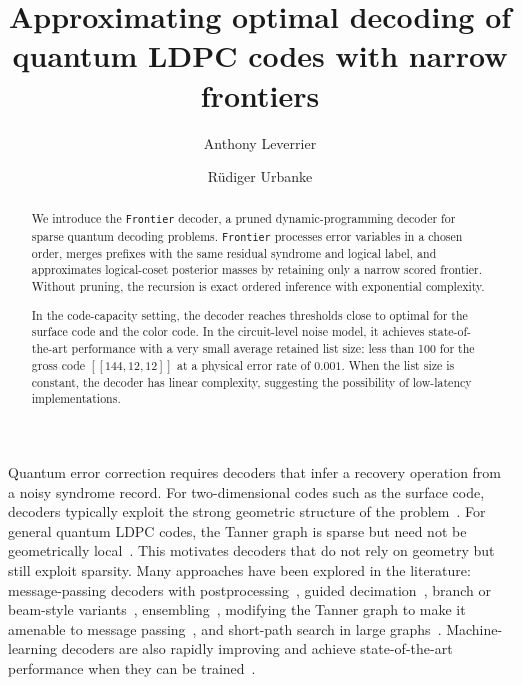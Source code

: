 \documentclass[a4paper,twocolumn,11pt,unpublished]{quantumarticle}
\newcommand{\frontier}{\texttt{Frontier}}
\begin{document}
\title{Approximating optimal decoding of quantum LDPC codes with narrow frontiers}

\author[AL]{Anthony Leverrier}
\author[RU]{R{\"u}diger Urbanke}

\begin{abstract}
We introduce the \frontier{} decoder, a pruned dynamic-programming decoder for sparse quantum decoding problems.  \frontier{} processes error variables in a chosen order, merges prefixes with the same residual syndrome and logical label, and approximates logical-coset posterior masses by retaining only a narrow scored frontier.  Without pruning, the recursion is exact ordered inference with exponential complexity. 

In the code-capacity setting, the decoder reaches thresholds close to optimal for the surface code and the color code. In the circuit-level noise model, it achieves state-of-the-art performance with a very small average retained list size: less than 100 for the gross code $[[144,12,12]]$ at a physical error rate of $0.001$. When the list size is constant, the decoder has linear complexity, suggesting the possibility of low-latency implementations.
\end{abstract}



\maketitle

Quantum error correction requires decoders that infer a recovery operation from a noisy syndrome record.  
For two-dimensional codes such as the surface code, decoders typically exploit the strong geometric structure of the problem~\cite{Dennis2002,Edmonds1965,Fowler2012Surface,Delfosse2021UnionFind,Bravyi2014TensorNetwork,Higgott2022PyMatching,HiggottGidney2025SparseBlossom}.  For general quantum LDPC codes, the Tanner graph is sparse but need not be geometrically local~\cite{MacKay2004SparseGraphQuantum,TillichZemor2014HGP,Breuckmann2021QLDPC,PanteleevKalachev2022GoodQLDPC,LeverrierZemor2022QuantumTanner,Bravyi2024BB}.  This motivates decoders that do not rely on geometry but still exploit sparsity. Many approaches have been explored in the literature: message-passing decoders with postprocessing~\cite{Roffe2020BP_OSD,Hillmann2025LSD,DeMarti2024BPOTF}, guided decimation~\cite{Yao2024BPGD,Gong2024GDG}, branch or beam-style variants~\cite{DeMarti2024ClosedBranch,YeWeckerDelfosse2025BeamSearch}, ensembling~\cite{Muller2025RelayBP,Koutsioumpas2025AutDEC}, modifying the Tanner graph to make it amenable to message passing~\cite{Maan2026GARI}, and short-path search in large graphs~\cite{AghababaieBeni2025Tesseract,Ott2025DecisionTree}. Machine-learning decoders are also rapidly improving and achieve state-of-the-art performance when they can be trained~\cite{Bausch2024AlphaQubit,Blue2025BBTransformer,Gu2026Cascade}.
\end{document}
